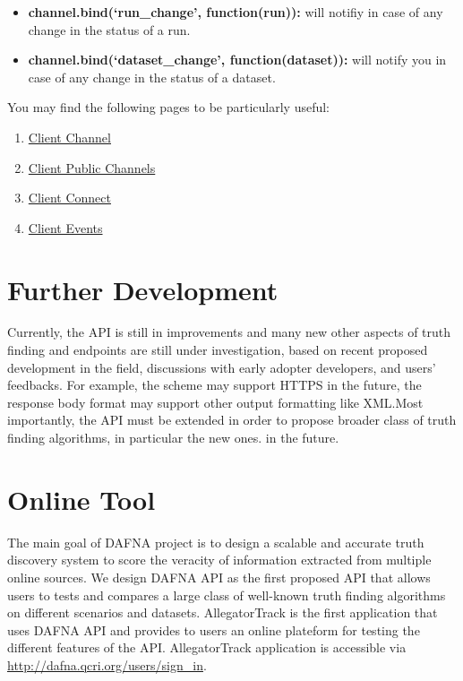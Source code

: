 \documentclass[a4paper,10pt]{scrartcl}
\begin{document}
\begin{itemize}
 \item \textbf{channel.bind(`run\_change', function(run){}):} will notifiy in case of any change in the status of a run.
 \item \textbf{channel.bind(`dataset\_change', function(dataset){}):} will notify you in case of any change in the status of a dataset. 
\end{itemize}
You may find the following pages to be particularly useful:
\begin{enumerate}
 \item \href{https://pusher.com/docs/client_api_guide/client_channels}{Client Channel}
 \item \href{https://pusher.com/docs/client_api_guide/client_public_channels}{Client Public Channels}
 \item \href{https://pusher.com/docs/client_api_guide/client_connect}{Client Connect}
 \item \href{https://pusher.com/docs/client_api_guide/client_events}{Client Events}
\end{enumerate}

\section{Further Development}
Currently, the API is still in improvements and many new other aspects of truth finding and endpoints are still under investigation, based on recent
proposed development in the field, discussions with early adopter developers, and users' feedbacks. For example, the scheme may support HTTPS in the 
future, the response body format may support other output formatting like XML.Most importantly, the API must be extended in order to propose broader 
class of truth finding algorithms, in particular the new ones.
in the future.
\section{Online Tool}
The main goal of DAFNA project is to design a scalable and accurate truth discovery system to score the veracity of information extracted from multiple 
online sources.  We design DAFNA API as the first proposed API that allows users to tests and compares a large class of well-known truth finding algorithms
on different scenarios and datasets. AllegatorTrack is the first application that uses DAFNA API and provides to users
an online plateform for testing the different features of the API. AllegatorTrack application is accessible via \href{http://dafna.qcri.org/users/sign\_in}{http://dafna.qcri.org/users/sign\_in}.
\end{document}
